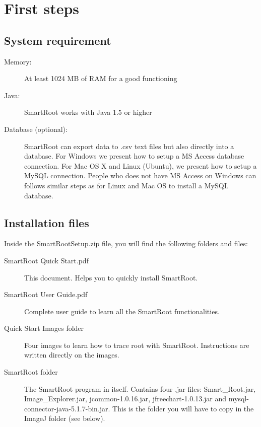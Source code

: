 

{\color{coolSection}\section{First steps}}

{\color{coolSubSection}\subsection{System requirement}}

\begin{description}
\item [Memory:] At least 1024 MB of RAM for a good functioning
\item [Java:] SmartRoot works with Java 1.5 or higher
\item [Database (optional):] SmartRoot can export data to .csv text files but also directly into a database. For Windows we present how to setup a MS Access database connection. For Mac OS X and Linux (Ubuntu), we present how to setup a MySQL connection. People who does not have MS Access on Windows can follows similar steps as for Linux and Mac OS to install a MySQL database.
\end{description}


{\color{coolSubSection}\subsection{Installation files}}

\noindent Inside the SmartRootSetup.zip file, you will find the following folders and files:\\

\begin{description}
\item [SmartRoot Quick Start.pdf] This document. Helps you to quickly install SmartRoot.
\item[SmartRoot User Guide.pdf] Complete user guide to learn all the SmartRoot functionalities. 
\item [Quick Start Images folder] Four images to learn how to trace root with SmartRoot. Instructions are written directly on the images.
\item [SmartRoot folder] The SmartRoot program in itself. Contains four .jar files: Smart\_Root.jar, Image\_Explorer.jar, jcommon-1.0.16.jar, jfreechart-1.0.13.jar and mysql-connector-java-5.1.7-bin.jar. This is the folder you will have to copy in the ImageJ folder (see below).
\end{description}


